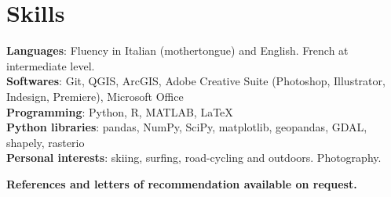 \documentclass[letterpaper,11pt]{article}
\begin{document}
\section{Skills}
 \begin{itemize}[leftmargin=0.15in, label={}]
    \small{\item{
     \textbf{Languages}{: Fluency in Italian (mothertongue) and English. French at intermediate level.} \\
     \textbf{Softwares}{: Git, QGIS, ArcGIS, Adobe Creative Suite (Photoshop, Illustrator, Indesign, Premiere), \indent Microsoft Office} \\
     \textbf{Programming}{: Python, R, MATLAB, \LaTeX} \\
     \textbf{Python libraries}{: pandas, NumPy, SciPy, matplotlib, geopandas, GDAL, shapely, rasterio}\\
     \textbf{Personal interests}{: skiing, surfing, road-cycling and outdoors. Photography.}\\
}}
 \end{itemize}

\centering
\textbf{References and letters of recommendation available on request.}

\end{document}
